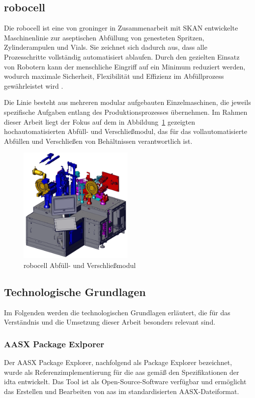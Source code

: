 \subsection{robocell}
Die robocell ist eine von groninger in Zusammenarbeit mit SKAN entwickelte Maschinenlinie zur aseptischen Abfüllung von genesteten Spritzen, Zylinderampulen und Vials.
Sie zeichnet sich dadurch aus, dass alle Prozesschritte vollständig automatisiert ablaufen.
Durch den gezielten Einsatz von Robotern kann der menschliche Eingriff auf ein Minimum reduziert werden, wodurch maximale Sicherheit, Flexibilität und Effizienz im Abfüllprozess gewährleistet wird \cite{RobocellWebsite}.

Die Linie besteht aus mehreren modular aufgebauten Einzelmaschinen, die jeweils spezifische Aufgaben entlang des Produktionsprozesses übernehmen. 
Im Rahmen dieser Arbeit liegt der Fokus auf dem in Abbildung~\ref{fig:robocell} gezeigten hochautomatisierten Abfüll- und Verschließmodul, das für das vollautomatisierte Abfüllen und Verschließen von Behältnissen verantwortlich ist.

\begin{figure}[htbp]
    \centering
    \includegraphics[width=0.5\textwidth]{Bilder/robocell/filling_closing_module.png}
    \caption{robocell Abfüll- und Verschließmodul \cite{RobocellBetriebsanleitung}}
    \label{fig:robocell}
\end{figure}

\subsection{Technologische Grundlagen}
Im Folgenden werden die technologischen Grundlagen erläutert, die für das Verständnis und die Umsetzung dieser Arbeit besonders relevant sind.
\subsubsection{AASX Package Exlporer}
Der AASX Package Explorer, nachfolgend als Package Explorer bezeichnet, wurde als Referenzimplementierung für die \acs{aas} gemäß den Spezifikationen der \acs{idta} entwickelt.
Das Tool ist als Open-Source-Software \cite{AASXPackageExplorer} verfügbar und ermöglicht das Erstellen und Bearbeiten von \acs{aas} im standardisierten AASX-Dateiformat.

